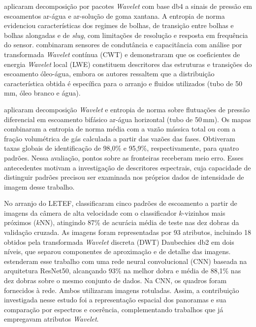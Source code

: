  aplicaram decomposição por pacotes \textit{Wavelet}
com base db4 a sinais de pressão em escoamentos ar-água e ar-solução de
goma xantana. A entropia de norma evidenciou características dos regimes de
bolhas, de transição entre bolhas e bolhas alongadas e de \textit{slug}, com
limitações de resolução e resposta em frequência do sensor.
 combinaram sensores de
condutância e capacitância com análise por transformada \textit{Wavelet} contínua (CWT) e
demonstraram que os coeficientes de energia \textit{Wavelet} local (LWE) constituem
descritores das estruturas e transições do escoamento óleo-água, embora os autores
ressaltem que a distribuição característica obtida é específica para o arranjo e fluidos
utilizados (tubo de 50\,mm, óleo branco e água).

 aplicaram decomposição \textit{Wavelet} e entropia de norma
sobre flutuações de pressão diferencial em escoamento bifásico ar-água horizontal
(tubo de 50\,mm). Os mapas combinaram a entropia de norma média com a vazão mássica
total ou com a fração volumétrica de gás calculada a partir das vazões das fases.
Obtiveram taxas globais de identificação de 98{,}0\% e 95{,}9\%, respectivamente,
para quatro padrões. Nessa avaliação,
pontos sobre as fronteiras receberam meio erro. Esses antecedentes motivam a
investigação de descritores espectrais, cuja capacidade de distinguir padrões
precisou ser examinada nos próprios dados de intensidade de imagem desse trabalho.

No arranjo do LETEF, 
classificaram cinco padrões de escoamento a partir de imagens da câmera de alta velocidade
com o classificador $k$-vizinhos mais próximos ($k$NN), atingindo 87\% de acurácia
média de teste nas dez dobras da validação cruzada. As imagens foram representadas
por 93 atributos, incluindo 18 obtidos pela transformada \textit{Wavelet} discreta
(DWT) Daubechies db2 em dois níveis, que separou componentes de aproximação e
de detalhe das imagens.
 estenderam
esse trabalho com uma rede neural convolucional (CNN) baseada na arquitetura ResNet50,
alcançando 93\% na melhor dobra e média de 88{,}1\% nas dez dobras sobre o mesmo
conjunto de dados. Na CNN, os quadros foram fornecidos à rede. Ambos utilizaram
imagens rotuladas. Assim, a contribuição investigada nesse estudo foi a representação
espacial dos panoramas e sua comparação por espectros e coerência, complementando
trabalhos que já empregavam atributos \textit{Wavelet}.

